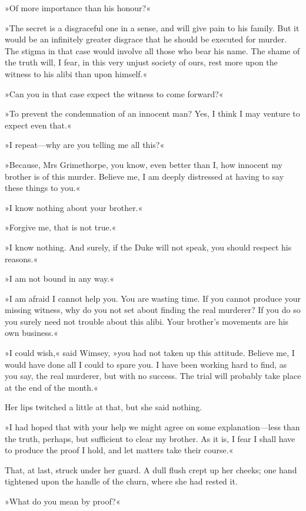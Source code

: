 »Of more importance than his honour?«

»The secret is a disgraceful one in a sense, and will give pain to his family. But it would be an infinitely greater disgrace that he should be executed for murder. The stigma in that case would involve all those who bear his name. The shame of the truth will, I fear, in this very unjust society of ours, rest more upon the witness to his alibi than upon himself.«

»Can you in that case expect the witness to come forward?«

»To prevent the condemnation of an innocent man? Yes, I think I may venture to expect even that.«

»I repeat—why are you telling me all this?«

»Because, Mrs Grimethorpe, you know, even better than I, how innocent my brother is of this murder. Believe me, I am deeply distressed at having to say these things to you.«

»I know nothing about your brother.«

»Forgive me, that is not true.«

»I know nothing. And surely, if the Duke will not speak, you should respect his reasons.«

»I am not bound in any way.«

»I am afraid I cannot help you. You are wasting time. If you cannot produce your missing witness, why do you not set about finding the real murderer? If you do so you surely need not trouble about this alibi.  Your brother's movements are his own business.«

»I could wish,« said Wimsey, »you had not taken up this attitude.  Believe me, I would have done all I could to spare you. I have been working hard to find, as you say, the real murderer, but with no success. The trial will probably take place at the end of the month.«

Her lips twitched a little at that, but she said nothing.

»I had hoped that with your help we might agree on some explanation—less than the truth, perhaps, but sufficient to clear my brother. As it is, I fear I shall have to produce the proof I hold, and let matters take their course.«

That, at last, struck under her guard. A dull flush crept up her cheeks; one hand tightened upon the handle of the churn, where she had rested it.

»What do you mean by proof?«

